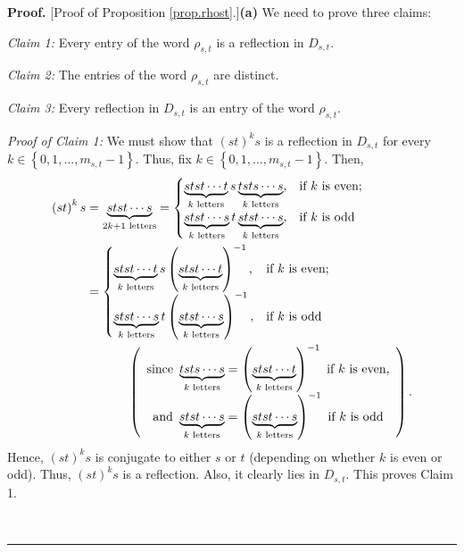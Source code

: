 \documentclass[numbers=enddot,12pt,final,onecolumn,notitlepage,abstracton]{scrartcl}%
\theoremstyle{definition}
\newenvironment{proof}[1][Proof]{\noindent\textbf{#1.} }{\ \rule{0.5em}{0.5em}}
\begin{document}
\begin{proof}
[Proof of Proposition \ref{prop.rhost}.]\textbf{(a)} We need to prove three claims:

\textit{Claim 1:} Every entry of the word $\rho_{s,t}$ is a reflection in
$D_{s,t}$.

\textit{Claim 2:} The entries of the word $\rho_{s,t}$ are distinct.

\textit{Claim 3:} Every reflection in $D_{s,t}$ is an entry of the word
$\rho_{s,t}$.

\textit{Proof of Claim 1:} We must show that $\left(  st\right)  ^{k}s$ is a
reflection in $D_{s,t}$ for every $k\in\left\{  0,1,\ldots,m_{s,t}-1\right\}
$. Thus, fix $k\in\left\{  0,1,\ldots,m_{s,t}-1\right\}  $. Then,%
\begin{align*}
\left(  st\right)  ^{k}s  &  =\underbrace{stst\cdots s}_{2k+1\text{ letters}}=%
\begin{cases}
\underbrace{stst\cdots t}_{k\text{ letters}}s\underbrace{tsts\cdots
s}_{k\text{ letters}}, & \text{if }k\text{ is even};\\
\underbrace{stst\cdots s}_{k\text{ letters}}t\underbrace{stst\cdots
s}_{k\text{ letters}}, & \text{if }k\text{ is odd}%
\end{cases}
\\
&  =%
\begin{cases}
\underbrace{stst\cdots t}_{k\text{ letters}}s\left(  \underbrace{stst\cdots
t}_{k\text{ letters}}\right)  ^{-1}, & \text{if }k\text{ is even};\\
\underbrace{stst\cdots s}_{k\text{ letters}}t\left(  \underbrace{stst\cdots
s}_{k\text{ letters}}\right)  ^{-1}, & \text{if }k\text{ is odd}%
\end{cases}
\\
&  \ \ \ \ \ \ \ \ \ \ \left(
\begin{array}
[c]{c}%
\text{since }\underbrace{tsts\cdots s}_{k\text{ letters}}=\left(
\underbrace{stst\cdots t}_{k\text{ letters}}\right)  ^{-1}\text{ if }k\text{
is even,}\\
\text{and }\underbrace{stst\cdots s}_{k\text{ letters}}=\left(
\underbrace{stst\cdots s}_{k\text{ letters}}\right)  ^{-1}\text{ if }k\text{
is odd}%
\end{array}
\right)  .
\end{align*}
Hence, $\left(  st\right)  ^{k}s$ is conjugate to either $s$ or $t$ (depending
on whether $k$ is even or odd). Thus, $\left(  st\right)  ^{k}s$ is a
reflection. Also, it clearly lies in $D_{s,t}$. This proves Claim 1.


\end{proof}
\end{document}
